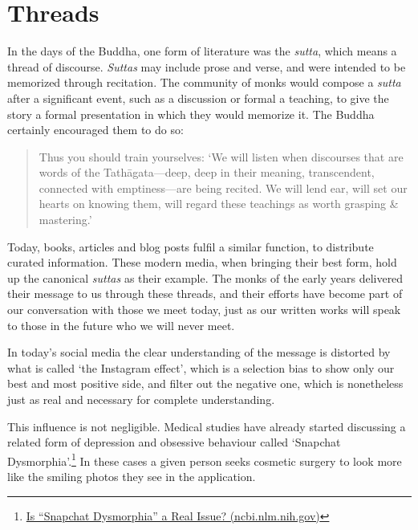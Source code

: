 \clearpage

\section{Threads}


\noindent In the days of the Buddha, one form of literature was the
\emph{sutta}, which means a thread of discourse. \emph{Suttas} may
include prose and verse, and were intended to be memorized through
recitation. The community of monks would compose a \emph{sutta} after a
significant event, such as a discussion or formal a teaching, to give
the story a formal presentation in which they would memorize it. The
Buddha certainly encouraged them to do so:

\begin{quote}
Thus you should train yourselves: `We will listen when discourses that
are words of the Tathāgata---deep, deep in their meaning, transcendent,
connected with emptiness---are being recited. We will lend ear, will set
our hearts on knowing them, will regard these teachings as worth
grasping \& mastering.'

\bigskip

\end{quote}

Today, books, articles and blog posts fulfil a similar function, to
distribute curated information. These modern media, when bringing their
best form, hold up the canonical \emph{suttas} as their example. The
monks of the early years delivered their message to us through these
threads, and their efforts have become part of our conversation with
those we meet today, just as our written works will speak to those in
the future who we will never meet.

\clearpage


In today's social media the clear understanding of the message is
distorted by what is called `the Instagram effect', which is a selection
bias to show only our best and most positive side, and filter out the
negative one, which is nonetheless just as real and necessary for
complete understanding.

This influence is not negligible. Medical studies have already started
discussing a related form of depression and obsessive behaviour called
`Snapchat Dysmorphia'.\footnote{\href{https://www.ncbi.nlm.nih.gov/pmc/articles/PMC5933578/}{Is
  ``Snapchat Dysmorphia'' a Real Issue? (ncbi.nlm.nih.gov)}} In these
cases a given person seeks cosmetic surgery to look more like the
smiling photos they see in the application.

